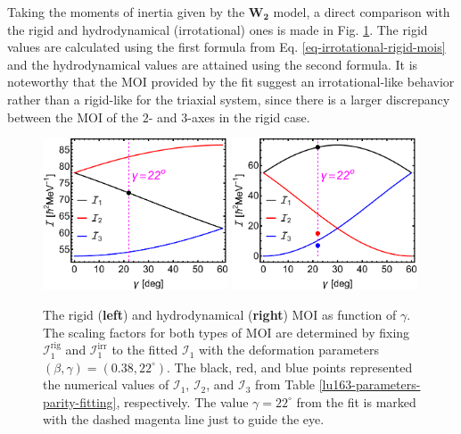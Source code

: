 Taking the moments of inertia given by the $\mathbf{W_2}$ model, a direct comparison with the rigid and hydrodynamical (irrotational) ones is made in Fig. \ref{w2-mois-comparison}. The rigid values are calculated using the first formula from Eq. \ref{eq-irrotational-rigid-mois} and the hydrodynamical values are attained using the second formula. It is noteworthy that the MOI provided by the fit suggest an irrotational-like behavior rather than a rigid-like for the triaxial system, since there is a larger discrepancy between the MOI of the $2$- and $3$-axes in the rigid case.
\begin{figure}
    \centering
    \includegraphics[width=0.49\textwidth]{Chapters/Figures/parity-partners-plots/rigid-mois-fit.pdf}
    \includegraphics[width=0.49\textwidth]{Chapters/Figures/parity-partners-plots/hydrodynamic-mois-fit.pdf}
    \caption{The rigid (\textbf{left}) and hydrodynamical (\textbf{right}) MOI as function of $\gamma$. The scaling factors for both types of MOI are determined by fixing $\mathcal{I}^\text{rig}_1$ and $\mathcal{I}_1^\text{irr}$ to the fitted $\mathcal{I}_1$ with the deformation parameters $(\beta,\gamma)=(0.38,22^\circ)$. The black, red, and blue points represented the numerical values of $\mathcal{I}_1$, $\mathcal{I}_2$, and $\mathcal{I}_3$ from Table \ref{lu163-parameters-parity-fitting}, respectively. The value $\gamma=22^\circ$ from the fit is marked with the dashed magenta line just to guide the eye.}
    \label{w2-mois-comparison}
\end{figure}

